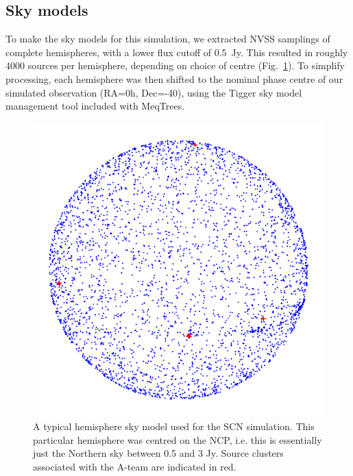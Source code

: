 \documentclass{aa}
\begin{document}
\subsection{Sky models}

To make the sky models for this simulation, we extracted NVSS samplings of complete hemispheres, with a lower flux cutoff of 0.5~Jy. This resulted in roughly 4000 sources per hemisphere, depending on choice of centre (Fig.~\ref{fig:ncp-skymodel}). To simplify processing, each hemisphere was then shifted to the nominal phase centre of our simulated observation (RA=0h, Dec=-40\degr), using the Tigger sky model management tool included with MeqTrees.

\begin{figure}
\centering \includegraphics[width=.7\columnwidth]{ncp-skymodel-transp}
\caption{\label{fig:ncp-skymodel}A typical hemisphere sky model used for the SCN simulation. This particular hemisphere was centred on the NCP, i.e. this is essentially just the Northern sky between 0.5 and 3 Jy. Source clusters associated with the A-team are indicated in red.}
\end{figure}
\end{document}
